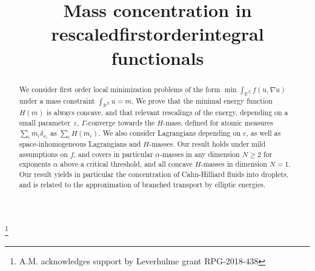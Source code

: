 \documentclass[JEP,XML,SOM,Unicode,published]{cedram}
\theoremstyle{plain}
\theoremstyle{definition}
\begin{document}
\frontmatter

\title{Mass concentration in rescaled\nobreakspace first\nobreakspace order\nobreakspace integral functionals}

\author[\initial{A.} \lastname{Monteil}]{ }
\address{Université Paris-Est Créteil Val-de-Marne, LAMA,\\
61 avenue du Général de Gaulle, 94010 Créteil, France}

\author[\initial{P.} \lastname{Pegon}]{ }
\address{Universit\'e Paris-Dauphine, CEREMADE \& INRIA Paris, MOKAPLAN,\\
France}

\thanks{A.M. acknowledges support by Leverhulme grant RPG-2018-438}

\begin{abstract}
We consider first order local minimization problems of the form $\min \int_{\mathbb{R}^N}f(u,\nabla u)$ under a mass constraint $\int_{\mathbb{R}^N}u=m$. We prove that the minimal energy function $H(m)$ is always concave, and that relevant rescalings of the energy, depending on a small parameter~$\varepsilon$, $\Gamma$-converge towards the $H$-mass, defined for atomic measures $\sum_i m_i\delta_{x_i}$ as $\sum_i H(m_i)$. We also consider Lagrangians depending on $\varepsilon$, as well as space-inhomogeneous Lagrangians and $H$\nobreakdash-masses. Our result holds under mild assumptions on $f$, and covers in particular $\alpha$-masses in any dimension $N\geq 2$ for exponents $\alpha$ above a critical threshold, and all concave $H$-masses in dimension $N=1$. Our result yields in particular the concentration of Cahn-Hilliard fluids into droplets, and is related to the approximation of branched transport by elliptic energies.
\end{abstract}



\end{document}
